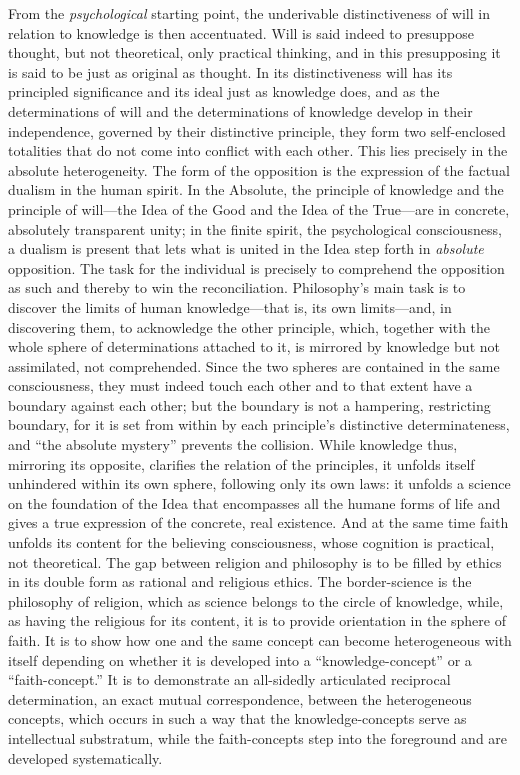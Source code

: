 \documentclass[12pt,a4paper]{book}
\begin{document}
From the \emph{psychological} starting point, the underivable distinctiveness
of will in relation to knowledge is then accentuated. Will is said
indeed to presuppose thought, but not theoretical, only practical
thinking, and in this presupposing it is said to be just as original as
thought. In its distinctiveness will has its principled significance and
its ideal just as knowledge does, and as the determinations of will and
the determinations of knowledge develop in their independence, governed
by their distinctive principle, they form two self-enclosed totalities
that do not come into conflict with each other. This lies precisely in
the absolute heterogeneity. The form of the opposition is the expression
of the factual dualism in the human spirit. In the Absolute, the
principle of knowledge and the principle of will---the Idea of the Good
and the Idea of the True---are in concrete, absolutely transparent
unity; in the finite spirit, the psychological consciousness, a dualism
is present that lets what is united in the Idea step forth in \emph{absolute}
opposition. The task for the individual is precisely to comprehend the
opposition as such and thereby to win the reconciliation. Philosophy's
main task is to discover the limits of human knowledge---that is, its
own limits---and, in discovering them, to acknowledge the other
principle, which, together with the whole sphere of determinations
attached to it, is mirrored by knowledge but not assimilated, not
comprehended. Since the two spheres are contained in the same
consciousness, they must indeed touch each other and to that extent have
a boundary against each other; but the boundary is not a hampering,
restricting boundary, for it is set from within by each principle's
distinctive determinateness, and ``the absolute mystery'' prevents the
collision. While knowledge thus, mirroring its opposite, clarifies the
relation of the principles, it unfolds itself unhindered within its own
sphere, following only its own laws: it unfolds a science on the
foundation of the Idea that encompasses all the humane forms of life and
gives a true expression of the concrete, real existence. And at the same
time faith unfolds its content for the believing consciousness, whose
cognition is practical, not theoretical. The gap between religion and
philosophy is to be filled by ethics in its double form as rational and
religious ethics. The border-science is the philosophy of religion,
which as science belongs to the circle of knowledge, while, as having
the religious for its content, it is to provide orientation in the
sphere of faith. It is to show how one and the same concept can become
heterogeneous with itself depending on whether it is developed into a
``knowledge-concept'' or a ``faith-concept.'' It is to demonstrate an
all-sidedly articulated reciprocal determination, an exact mutual
correspondence, between the heterogeneous concepts, which occurs in such
a way that the knowledge-concepts serve as intellectual substratum,
while the faith-concepts step into the foreground and are developed
systematically.
\end{document}
